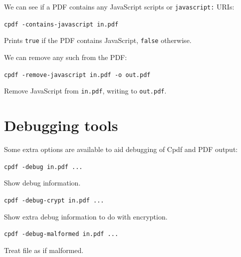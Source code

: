 \documentclass{book}
\begin{document}
We can see if a PDF contains any JavaScript scripts or \texttt{javascript:} URIs:

  \begin{framed}
  \small\noindent\verb!cpdf -contains-javascript in.pdf!

  \vspace{2.5mm}
  \noindent Prints \texttt{true} if the PDF contains JavaScript, \texttt{false} otherwise. 

  \end{framed}

\noindent We can remove any such from the PDF:

  \begin{framed}
  \small\noindent\verb!cpdf -remove-javascript in.pdf -o out.pdf!

  \vspace{2.5mm}
  \noindent Remove JavaScript from \texttt{in.pdf}, writing to \texttt{out.pdf}. 

  \end{framed}

\section{Debugging tools}

Some extra options are available to aid debugging of Cpdf and PDF output:

  \begin{framed}
  \small\noindent\verb!cpdf -debug in.pdf ...!

  \vspace{2.5mm}
  \noindent Show debug information. 

  \end{framed}

  \begin{framed}
  \small\noindent\verb!cpdf -debug-crypt in.pdf ...!

  \vspace{2.5mm}
  \noindent Show extra debug information to do with encryption. 

  \end{framed}

  \begin{framed}
  \small\noindent\verb!cpdf -debug-malformed in.pdf ...!

  \vspace{2.5mm}
  \noindent Treat file as if malformed. 

  \end{framed}
\end{document}

